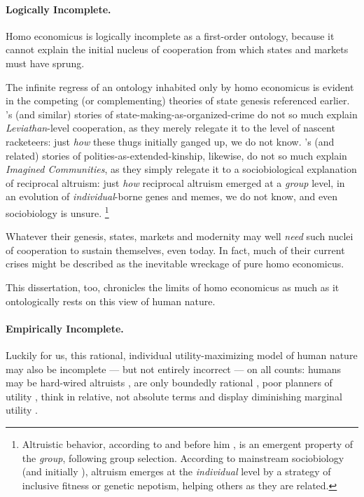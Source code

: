 {\paragraph{Logically Incomplete.}
Homo economicus is logically incomplete as a first-order ontology, because it cannot explain the initial nucleus of cooperation from which states and markets must have sprung.

The infinite regress of an ontology inhabited only by homo economicus is evident in the competing (or complementing) theories of state genesis referenced earlier.
\citeauthor{Tilly-1985-aa}'s (and similar) stories of state-making-as-organized-crime do not so much explain \emph{Leviathan}-level cooperation, as they merely relegate it to the level of nascent racketeers:
just \emph{how} these thugs initially ganged up, we do not know.
\citeauthor{Van-den-Berghe-1981-aa}'s (and related) stories of polities-as-extended-kinship, likewise, do not so much explain \emph{Imagined Communities}, as they simply relegate it to a sociobiological explanation of reciprocal altruism:
just \emph{how} reciprocal altruism emerged at a \emph{group} level, in an evolution of \emph{individual}-borne genes and memes, we do not know, and even sociobiology is unsure.
\footnote{
	Altruistic behavior, according to \cite{Wilson2012} and before him \cite{Darwin1859}, is an emergent property of the \emph{group}, following group selection.
	According to mainstream sociobiology (and initially \citealt{Wilson1975}), altruism emerges at the \emph{individual} level by a strategy of inclusive fitness or genetic nepotism, helping others as they are related.
}

Whatever their genesis, states, markets and modernity may well \emph{need} such nuclei of cooperation to sustain themselves, even today.
In fact, much of their current crises might be described as the inevitable wreckage of pure homo economicus.

This dissertation, too, chronicles the limits of homo economicus as much as it ontologically rests on this view of human nature.

\paragraph{Empirically Incomplete.}
Luckily for us, this rational, individual utility-maximizing model of human nature may also be incomplete --- but not entirely incorrect --- on all counts:
humans may be hard-wired altruists \citep[for example,][]{Zak2004}, are only boundedly rational \citep{Simon-1999-aa,Kahneman2011}, poor planners of utility \citep[summarized in][]{Gilbert2006}, think in relative, not absolute terms \citep{Frank2005} and display diminishing marginal utility \citep{Ng-1997-aa,Veenhoven-2000-aa,Nickell2008}.

}
